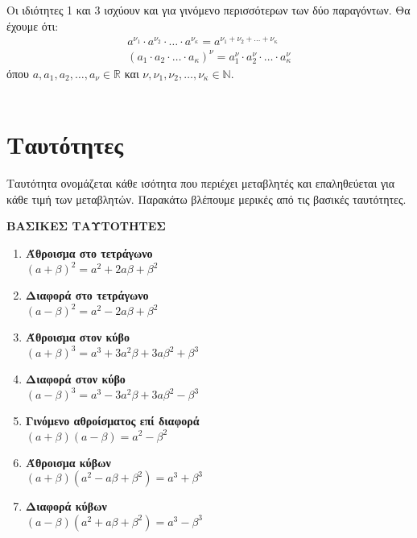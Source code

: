 Οι ιδιότητες 1 και 3 ισχύουν και για γινόμενο περισσότερων των δύο παραγόντων. Θα έχουμε ότι:
\begin{gather*}
a^{\nu_1}\cdot a^{\nu_2}\cdot\ldots\cdot a^{\nu_\kappa}=a^{\nu_1+\nu_2+\ldots+\nu_\kappa}\\
\left( a_1\cdot a_2\cdot\ldots\cdot a_\kappa\right)^\nu=a_1^\nu\cdot a_2^\nu\cdot\ldots\cdot a_\kappa^\nu
\end{gather*}
όπου $ a,a_1,a_2,\ldots,a_\nu\in\mathbb{R} $ και $ \nu,\nu_1,\nu_2,\ldots,\nu_\kappa\in\mathbb{N} $.\\\\
\Lymena
\section{Ταυτότητες}
\Thewria
\orismoi
{}
Ταυτότητα ονομάζεται κάθε ισότητα που περιέχει μεταβλητές και επαληθεύεται για κάθε τιμή των μεταβλητών. Παρακάτω βλέπουμε μερικές από τις βασικές ταυτότητες.
\begin{center}
\textbf{ΒΑΣΙΚΕΣ ΤΑΥΤΟΤΗΤΕΣ}
\end{center}
\begin{multicols}{2}
\begin{enumerate}[itemsep=0mm,label=\bf\arabic*.]
\item \parbox[t]{7cm}{\textbf{Άθροισμα στο τετράγωνο}\\$ (a+\beta)^2=a^2+2a\beta+\beta^2 $}
\item \parbox[t]{7cm}{\textbf{Διαφορά στο τετράγωνο}\\$ (a-\beta)^2=a^2-2a\beta+\beta^2 $}
\item \parbox[t]{7cm}{\textbf{Άθροισμα στον κύβο}\\$ (a+\beta)^3=a^3+3a^2\beta+3a\beta^2+\beta^3 $}
\item \parbox[t]{7cm}{\textbf{Διαφορά στον κύβο}\\$ (a-\beta)^3=a^3-3a^2\beta+3a\beta^2-\beta^3 $}
\item \parbox[t]{7cm}{\textbf{Γινόμενο αθροίσματος επί διαφορά}\\$ (a+\beta)(a-\beta)=a^2-\beta^2 $}
\item \parbox[t]{7cm}{\textbf{Άθροισμα κύβων}\\$ (a+\beta)\left(a^2-a\beta+\beta^2 \right)=a^3+\beta^3 $}
\item \parbox[t]{7cm}{\textbf{Διαφορά κύβων}\\$ (a-\beta)\left(a^2+a\beta+\beta^2 \right)=a^3-\beta^3 $}
\end{enumerate}
\end{multicols}\mbox{}\\
